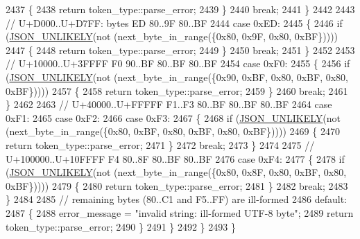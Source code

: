 \begin{DoxyCode}
2437                     \{
2438                         \textcolor{keywordflow}{return} token\_type::parse\_error;
2439                     \}
2440                     \textcolor{keywordflow}{break};
2441                 \}
2442 
2443                 \textcolor{comment}{// U+D000..U+D7FF: bytes ED 80..9F 80..BF}
2444                 \textcolor{keywordflow}{case} 0xED:
2445                 \{
2446                     \textcolor{keywordflow}{if} (\hyperlink{json_8hpp_ab77582407c64944e7db1ea95ab520253}{JSON\_UNLIKELY}(not (next\_byte\_in\_range(\{0x80, 0x9F, 0x80, 0xBF\}))))
2447                     \{
2448                         \textcolor{keywordflow}{return} token\_type::parse\_error;
2449                     \}
2450                     \textcolor{keywordflow}{break};
2451                 \}
2452 
2453                 \textcolor{comment}{// U+10000..U+3FFFF F0 90..BF 80..BF 80..BF}
2454                 \textcolor{keywordflow}{case} 0xF0:
2455                 \{
2456                     \textcolor{keywordflow}{if} (\hyperlink{json_8hpp_ab77582407c64944e7db1ea95ab520253}{JSON\_UNLIKELY}(not (next\_byte\_in\_range(\{0x90, 0xBF, 0x80, 0xBF, 0x80, 
      0xBF\}))))
2457                     \{
2458                         \textcolor{keywordflow}{return} token\_type::parse\_error;
2459                     \}
2460                     \textcolor{keywordflow}{break};
2461                 \}
2462 
2463                 \textcolor{comment}{// U+40000..U+FFFFF F1..F3 80..BF 80..BF 80..BF}
2464                 \textcolor{keywordflow}{case} 0xF1:
2465                 \textcolor{keywordflow}{case} 0xF2:
2466                 \textcolor{keywordflow}{case} 0xF3:
2467                 \{
2468                     \textcolor{keywordflow}{if} (\hyperlink{json_8hpp_ab77582407c64944e7db1ea95ab520253}{JSON\_UNLIKELY}(not (next\_byte\_in\_range(\{0x80, 0xBF, 0x80, 0xBF, 0x80, 
      0xBF\}))))
2469                     \{
2470                         \textcolor{keywordflow}{return} token\_type::parse\_error;
2471                     \}
2472                     \textcolor{keywordflow}{break};
2473                 \}
2474 
2475                 \textcolor{comment}{// U+100000..U+10FFFF F4 80..8F 80..BF 80..BF}
2476                 \textcolor{keywordflow}{case} 0xF4:
2477                 \{
2478                     \textcolor{keywordflow}{if} (\hyperlink{json_8hpp_ab77582407c64944e7db1ea95ab520253}{JSON\_UNLIKELY}(not (next\_byte\_in\_range(\{0x80, 0x8F, 0x80, 0xBF, 0x80, 
      0xBF\}))))
2479                     \{
2480                         \textcolor{keywordflow}{return} token\_type::parse\_error;
2481                     \}
2482                     \textcolor{keywordflow}{break};
2483                 \}
2484 
2485                 \textcolor{comment}{// remaining bytes (80..C1 and F5..FF) are ill-formed}
2486                 \textcolor{keywordflow}{default}:
2487                 \{
2488                     error\_message = \textcolor{stringliteral}{"invalid string: ill-formed UTF-8 byte"};
2489                     \textcolor{keywordflow}{return} token\_type::parse\_error;
2490                 \}
2491             \}
2492         \}
2493     \}
\end{DoxyCode}
